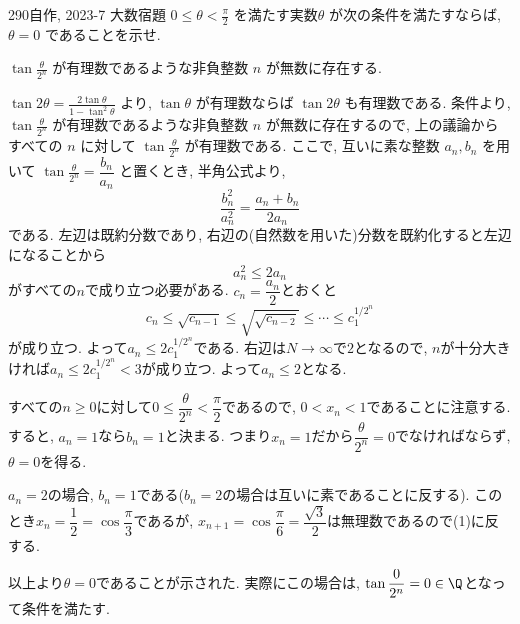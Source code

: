 \begin{prob}{290}{}{自作, 2023-7 大数宿題}
    $0\leq \theta < \frac{\pi}{2}$ を満たす実数$\theta$ が次の条件を満たすならば, $\theta = 0$ であることを示せ.

    $\tan{\frac{\theta}{2^n}}$ が有理数であるような非負整数 $n$ が無数に存在する.
\end{prob}

$\tan{2\theta} = \frac{2\tan{\theta}}{1-\tan^2{\theta}}$ より, $\tan{\theta}$ が有理数ならば $\tan{2\theta}$ も有理数である.
条件より, $\tan{\frac{\theta}{2^n}}$ が有理数であるような非負整数 $n$ が無数に存在するので, 上の議論からすべての $n$ に対して $\tan{\frac{\theta}{2^n}}$ が有理数である.
ここで, 互いに素な整数 $a_n, b_n$ を用いて $\tan{\frac{\theta}{2^n}} = \dfrac{b_n}{a_n}$ と置くとき,
半角公式より,
\[
\dfrac{b_n^2}{a_n^2} = \dfrac{a_n + b_n}{2a_n}
\]
である. 左辺は既約分数であり, 右辺の(自然数を用いた)分数を既約化すると左辺になることから
\[
a_n^2 \leq 2a_n
\]
がすべての$n$で成り立つ必要がある. $c_n = \dfrac{a_n}{2}$とおくと
\[
c_n \leq \sqrt{c_{n-1}} \leq \sqrt{\sqrt{c_{n-2}}} \leq \cdots \leq c_1^{1/2^n}
\]
が成り立つ. よって$a_n \leq 2c_1^{1/2^{n}}$である. 右辺は$N\to\infty$で$2$となるので,  $n$が十分大きければ$a_n \leq 2c_1^{1/2^n} < 3$が成り立つ. よって$a_n \leq 2$となる. \par
すべての$n\geq 0$に対して$0\leq \dfrac{\theta}{2^n} < \dfrac{\pi}{2}$であるので, $0<x_n<1$であることに注意する. すると, $a_n = 1$なら$b_n = 1$と決まる. つまり$x_n = 1$だから$\dfrac{\theta}{2^n} = 0$でなければならず, $\theta=0$を得る. \par
$a_n = 2$の場合, $b_n = 1$である($b_n = 2$の場合は互いに素であることに反する). このとき$x_n = \dfrac{1}{2} = \cos{\dfrac{\pi}{3}}$であるが, $x_{n+1} = \cos{\dfrac{\pi}{6}} = \dfrac{\sqrt{3}}{2}$は無理数であるので(1)に反する. \par
以上より$\theta=0$であることが示された. 実際にこの場合は, $\tan{\dfrac{0}{2^n}} = 0\in \Q$となって条件を満たす.

